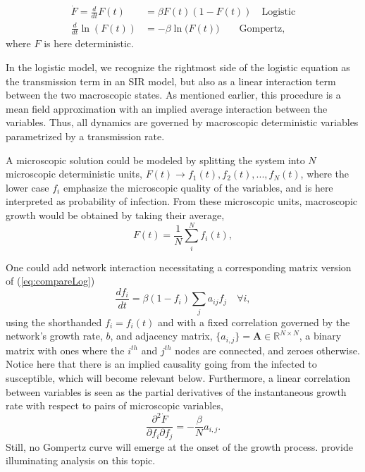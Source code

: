 \documentclass{article}
\begin{document}
\begin{subequations}
\begin{align}
\dot{F} = \frac{d}{dt}F(t) & = \beta F(t) (1-F(t)) \quad \text{Logistic}\label{eq:compareLog}\\ 
\frac{d}{dt}\ln{(F(t))} & = -\beta \ln{(F(t)}) \quad\quad\text{Gompertz}\label{eq:compareGom},
\end{align}
\end{subequations}
where $F$ is here deterministic. 

In the logistic model, we recognize the rightmost side of the logistic equation as the transmission term in an SIR model, but also as a linear interaction term between the two macroscopic states. 
As mentioned earlier, this procedure is a mean field approximation with an implied average interaction between the variables. 
Thus, all dynamics are governed by macroscopic deterministic variables parametrized by a transmission rate.

A microscopic solution could be modeled by splitting the system into $N$ microscopic deterministic units, $F(t) \rightarrow f_1(t), f_2(t), ..., f_N(t)$, where the lower case $f_i$ emphasize the microscopic quality of the variables, and is here interpreted as probability of infection. From these microscopic units, macroscopic growth would be obtained by taking their average,
\begin{equation}
F(t) = \frac{1}{N}\sum_i^N f_i(t),
\end{equation}

One could add network interaction necessitating a corresponding matrix version of (\ref{eq:compareLog})
\begin{equation}
\label{eq:networkSIR}
\frac{d f_i}{dt} = \beta (1-f_i)\sum_j{a_{ij}}f_j \quad \forall i,
\end{equation}
using the shorthanded $f_i=f_i(t)$ and with a fixed correlation governed by the network's growth rate, $b$, and adjacency matrix, $\{a_{i,j}\}=\mathbf{A} \in \mathbb{R}^{N \times N}$, a binary matrix with ones where the $i^{th}$ and $j^{th}$ nodes are connected, and zeroes otherwise. Notice here that there is an implied causality going from the infected to susceptible, which will become relevant below. Furthermore, a linear correlation between variables is seen as the partial derivatives of the instantaneous growth rate with respect to pairs of microscopic variables,
\begin{equation}
\frac{\partial^2 \dot{F}}{\partial f_i \partial f_j} = -\frac{\beta}{N} a_{i,j}.
\end{equation}
Still, no Gompertz curve will emerge at the onset of the growth process. \citet{estrada2022networked} provide illuminating analysis on this topic.
\end{document}

